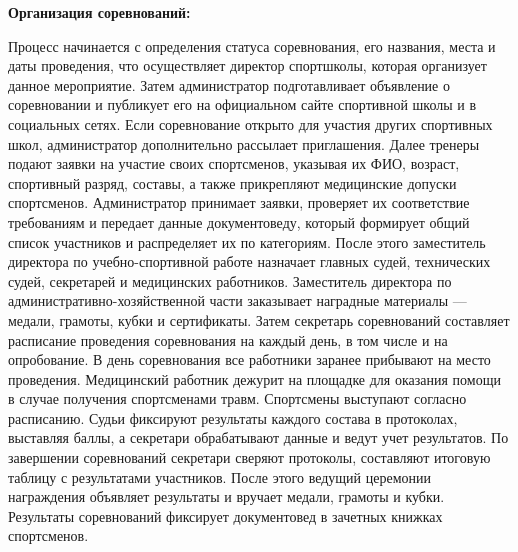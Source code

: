 \documentclass[12pt,a4paper,final]{article} %
\begin{document}
\par \textbf{Организация соревнований:} \\
\par Процесс начинается с определения статуса соревнования, его названия, места и даты проведения, что осуществляет директор спортшколы, которая организует данное мероприятие. Затем администратор подготавливает объявление о соревновании и публикует его на официальном сайте спортивной школы и в социальных сетях. Если соревнование открыто для участия других спортивных школ, администратор дополнительно рассылает приглашения. Далее тренеры подают заявки на участие своих спортсменов, указывая их ФИО, возраст, спортивный разряд, составы, а также прикрепляют медицинские допуски спортсменов. Администратор принимает заявки, проверяет их соответствие требованиям и передает данные документоведу, который формирует общий список участников и распределяет их по категориям. После этого заместитель директора по учебно-спортивной работе назначает главных судей, технических судей, секретарей и медицинских работников. Заместитель директора по административно-хозяйственной части заказывает наградные материалы — медали, грамоты, кубки и сертификаты. Затем секретарь соревнований составляет расписание проведения соревнования на каждый день, в том числе и на опробование. В день соревнования все работники заранее прибывают на место проведения. Медицинский работник дежурит на площадке для оказания помощи в случае получения спортсменами травм. Спортсмены выступают согласно расписанию. Судьи фиксируют результаты каждого состава в протоколах, выставляя баллы, а секретари обрабатывают данные и ведут учет результатов. По завершении соревнований секретари сверяют протоколы, составляют итоговую таблицу с результатами участников. После этого ведущий церемонии награждения объявляет результаты и вручает медали, грамоты и кубки. Результаты соревнований фиксирует документовед в зачетных книжках спортсменов.\\
\end{document}
